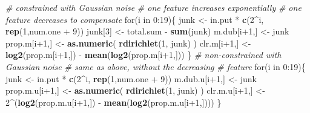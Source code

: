 \documentclass[twocolumn]{article}
\newenvironment{Shaded}{\begin{snugshade}}{\end{snugshade}}
\newcommand{\KeywordTok}[1]{\textcolor[rgb]{0.13,0.29,0.53}{\textbf{{#1}}}}
\newcommand{\DecValTok}[1]{\textcolor[rgb]{0.00,0.00,0.81}{{#1}}}
\newcommand{\StringTok}[1]{\textcolor[rgb]{0.31,0.60,0.02}{{#1}}}
\newcommand{\CommentTok}[1]{\textcolor[rgb]{0.56,0.35,0.01}{\textit{{#1}}}}
\newcommand{\NormalTok}[1]{{#1}}
\begin{document}
\begin{Shaded}
\begin{Highlighting}[]
\CommentTok{# constrained with Gaussian noise}
\CommentTok{# one feature increases exponentially}
\CommentTok{# one feature decreases to compensate}
\NormalTok{for(i in }\DecValTok{0}\NormalTok{:}\DecValTok{19}\NormalTok{)\{}
    \NormalTok{junk <-}\StringTok{ }\NormalTok{in.put *}\StringTok{ }\KeywordTok{c}\NormalTok{(}\DecValTok{2}\NormalTok{^i,}
        \KeywordTok{rep}\NormalTok{(}\DecValTok{1}\NormalTok{,num.one +}\StringTok{ }\DecValTok{9}\NormalTok{))}
    \NormalTok{junk[}\DecValTok{3}\NormalTok{] <-}\StringTok{ }\NormalTok{total.sum -}\StringTok{ }\KeywordTok{sum}\NormalTok{(junk)}
    \NormalTok{m.dub[i}\DecValTok{+1}\NormalTok{,] <-}\StringTok{ }\NormalTok{junk}
    \NormalTok{prop.m[i}\DecValTok{+1}\NormalTok{,] <-}\StringTok{ }\KeywordTok{as.numeric}\NormalTok{(}
        \KeywordTok{rdirichlet}\NormalTok{(}\DecValTok{1}\NormalTok{, junk) )}
    \NormalTok{clr.m[i}\DecValTok{+1}\NormalTok{,] <-}\StringTok{ }\KeywordTok{log2}\NormalTok{(prop.m[i}\DecValTok{+1}\NormalTok{,])}
        \NormalTok{-}\StringTok{ }\KeywordTok{mean}\NormalTok{(}\KeywordTok{log2}\NormalTok{(prop.m[i}\DecValTok{+1}\NormalTok{,]))}
\NormalTok{\}}
\CommentTok{# non-constrained with Gaussian noise}
\CommentTok{# same as above, without the decreasing}
\CommentTok{# feature}
\NormalTok{for(i in }\DecValTok{0}\NormalTok{:}\DecValTok{19}\NormalTok{)\{}
    \NormalTok{junk <-}\StringTok{ }\NormalTok{in.put *}\StringTok{ }\KeywordTok{c}\NormalTok{(}\DecValTok{2}\NormalTok{^i,}
        \KeywordTok{rep}\NormalTok{(}\DecValTok{1}\NormalTok{,num.one +}\StringTok{ }\DecValTok{9}\NormalTok{))}
    \NormalTok{m.dub.u[i}\DecValTok{+1}\NormalTok{,] <-}\StringTok{ }\NormalTok{junk}
    \NormalTok{prop.m.u[i}\DecValTok{+1}\NormalTok{,] <-}\StringTok{ }\KeywordTok{as.numeric}\NormalTok{(}
        \KeywordTok{rdirichlet}\NormalTok{(}\DecValTok{1}\NormalTok{, junk) )}
    \NormalTok{clr.m.u[i}\DecValTok{+1}\NormalTok{,] <-}\StringTok{ }\DecValTok{2}\NormalTok{^(}\KeywordTok{log2}\NormalTok{(prop.m.u[i}\DecValTok{+1}\NormalTok{,])}
        \NormalTok{-}\StringTok{ }\KeywordTok{mean}\NormalTok{(}\KeywordTok{log2}\NormalTok{(prop.m.u[i}\DecValTok{+1}\NormalTok{,])))}
\NormalTok{\}}


\end{Highlighting}
\end{Shaded}
\end{document}
